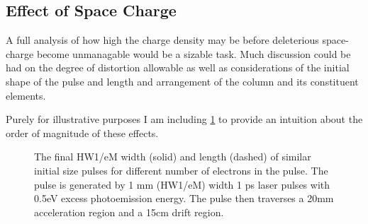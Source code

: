 \subsection{Effect of Space Charge} \label{sec:free_spacecharge}

A full analysis of how high the charge density may be before deleterious space-charge become unmanagable would be a sizable task.
Much discussion could be had on the degree of distortion allowable as well as considerations of the initial shape of the pulse and length and arrangement of the column and its constituent elements.

Purely for illustrative purposes I am including \ref{fig:spacecharge} to provide an intuition about the order of magnitude of these effects.


\begin{figure}
  \centering
  \begin{tikzpicture}
    
  \end{tikzpicture}
  \caption[Free-space pulse evolution vs charge density]{
    The final HW1/eM width (solid) and length (dashed) of similar initial size pulses for different number of electrons in the pulse.
    The pulse is generated by 1 mm (HW1/eM) width 1 ps laser pulses with 0.5eV excess photoemission energy. The pulse then traverses a 20mm acceleration region and a 15cm drift region.
  }
  \label{fig:spacecharge}
\end{figure}

